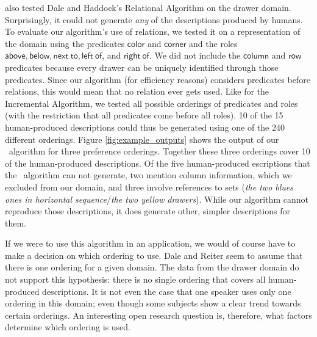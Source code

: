 





 also tested Dale and
Haddock's 
Relational Algorithm on the drawer domain. Surprisingly, it could not
generate \textit{any} of the descriptions produced by humans. To
evaluate our algorithm's use of relations, we tested it on a
representation of the domain using the predicates $\mathsf{color}$ and
$\mathsf{corner}$ and the roles $\mathsf{above, below, next\ to, left\ of}$,
and $\mathsf{right\ of}$. We did not include the $\mathsf{column}$ and
$\mathsf{row}$ predicates because every drawer can be uniquely
identified through those predicates. Since our algorithm (for
efficiency reasons)
considers predicates before relations, this would mean that no relation
ever gets used. Like for the Incremental Algorithm, we tested all
possible orderings of predicates and roles (with the restriction that
all predicates come before all roles). 10 of the 15 human-produced
descriptions could thus be generated using one of the 240 different
orderings. Figure \ref{fig:example_outputs} shows the output of our
\el\ algorithm for three preference orderings. Together these three
orderings cover 10 of the human-produced descriptions. 
Of the five human-produced escriptions that the \el\
algorithm can not generate, two mention column information, which we
excluded from our domain, and three involve references to sets
(\textit{the two blues ones in horizontal sequence}/\textit{the two
yellow drawers}). While our algorithm cannot reproduce those
descriptions, it does  generate other, simpler descriptions for them.


If we were to use this algorithm in an application, we would of course
have to make a decision on which ordering to use. Dale and Reiter
\shortcite{Dale1995} seem to assume that there is one ordering for a
given domain. The data from the drawer domain do not support this
hypothesis: there is no single ordering that covers all human-produced
descriptions. It is not even the case that one speaker uses only one
ordering in this domain; even though some subjects show a clear trend
towards certain orderings. An interesting open research question is,
therefore, what factors determine which ordering is used. 


